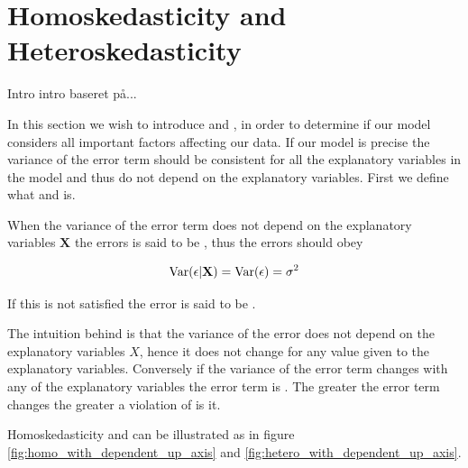 \newpage
\section{Homoskedasticity and Heteroskedasticity}
Intro intro baseret på...

In this section we wish to introduce \homo and \hetero, in order to determine if our model considers all important factors affecting our data. If our model is precise the variance of the error term should be consistent for all the explanatory variables in the model and thus do not depend on the explanatory variables. First we define what \homo and \hetero is. 

\begin{definition}
When the variance of the error term does not depend on the explanatory variables $\textbf{X}$ the errors is said to be \homo, thus the errors should obey

\begin{align*}
    \operatorname{\text{Var}}(\epsilon | \textbf{X}) = \operatorname{\text{Var}}(\epsilon) = \sigma^2
\end{align*}

If this is not satisfied the error is said to be \hetero. 

\end{definition}

The intuition behind \homo is that the variance of the error does not depend on the explanatory variables $X$, hence it does not change for any value given to the explanatory variables. Conversely if the variance of the error term changes with any of the explanatory variables the error term is \hetero. The greater the error term changes the greater a violation of \homo is it. 


Homoskedasticity and \hetero can be illustrated as in figure \ref{fig:homo_with_dependent_up_axis} and \ref{fig:hetero_with_dependent_up_axis}. 


